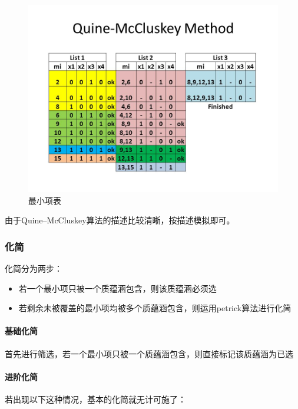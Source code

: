 	\begin{figure}[h]
		\centering
		\includegraphics[scale=0.5]{images/QM.jpg}
		\caption{最小项表}
	\end{figure}
	
	由于Quine–McCluskey算法的描述比较清晰，按描述模拟即可。
	
		

\subsubsection{化简}
	化简分为两步：
	\begin{itemize}
		\item	若一个最小项只被一个质蕴涵包含，则该质蕴涵必须选
		\item	若剩余未被覆盖的最小项均被多个质蕴涵包含，则运用petrick算法进行化简
	\end{itemize}
\paragraph{基础化简\\}
	首先进行筛选，若一个最小项只被一个质蕴涵包含，则直接标记该质蕴涵为已选

		

\paragraph{进阶化简\\}
	若出现以下这种情况，基本的化简就无计可施了：

